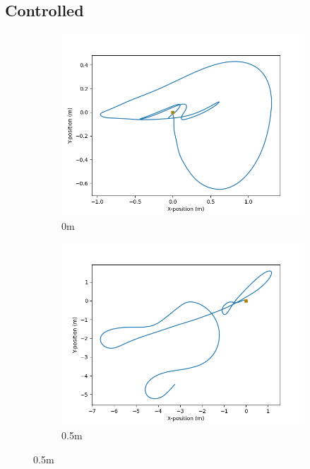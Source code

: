 \documentclass[class=article, crop=false]{standalone}
\begin{document}
\subsection{Controlled}
\begin{figure}
    \centering
    \begin{subfigure}[b]{0.48\textwidth}
        \centering
        \includegraphics{scenario1/rov-0m/0.0m/usv_position_controlled}
        \caption{0m}
        \label{}
    \end{subfigure}
    \hfill
    \begin{subfigure}[b]{0.48\textwidth}
        \centering
        \includegraphics{scenario1/rov-0m/0.5m/usv_position_controlled}
        \caption{0.5m}
        \label{}

\end{subfigure}
\end{figure}
\end{document}

